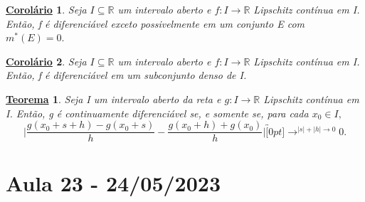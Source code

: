 \documentclass{article}
\newtheorem*{theorem*}{\underline{Teorema}}
\newtheorem*{crl*}{\underline{Corol\'ario}}
\begin{document}
 \begin{crl*}
   Seja \(I\subseteq{\mathbb{R}}\) um intervalo aberto e \(f:I\rightarrow \mathbb{R}\) Lipschitz contínua em I.
  Então, f é diferenciável exceto possivelmente em um conjunto E com \(m^{*}(E) = 0.\)
 \end{crl*}
\begin{crl*}
  Seja \(I\subseteq{\mathbb{R}}\) um intervalo aberto e \(f:I\rightarrow \mathbb{R}\) Lipschitz contínua em I. Então, f é diferenciável em um
  subconjunto denso de I.
\end{crl*}
 \begin{theorem*}
   Seja I um intervalo aberto da reta e \(g:I\rightarrow \mathbb{R}\) Lipschitz contínua
   em I. Então, g é continuamente diferenciável se, e somente se, para cada \(x_{0}\in I,\) 
     \[
       \biggl|\frac{g(x_{0}+s+h)-g(x_{0}+s)}{h}-\frac{g(x_{0}+h)+g(x_{0})}{h}\biggr|\overbracket[0pt]{\longrightarrow}^{|s|+|h|\to 0}0.
     \]
 \end{theorem*}
\newpage

\section{Aula 23 - 24/05/2023}
\end{document}
